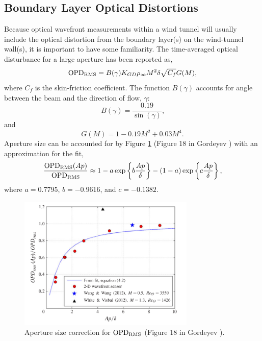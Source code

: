 \subsection{Boundary Layer Optical Distortions}
\label{sect:02_BL_OPD}
Because optical wavefront measurements within a wind tunnel will usually include the optical distortion from the boundary layer(s) on the wind-tunnel wall(s), it is important to have some familiarity.
The time-averaged optical disturbance for a large aperture has been reported as,
\begin{equation}
  \operatorname{OPD_{RMS}} = B(\gamma)K_{GD}\rho_\infty M^2\delta\sqrt{C_f}G(M) \textrm{,}
  \label{eqn:02_opdrms_gor}
\end{equation}
where $C_f$ is the skin-friction coefficient.
The function $B(\gamma)$ accounts for angle between the beam and the direction of flow, $\gamma$:
\begin{equation}
  B(\gamma) = \frac{0.19}{\sin(\gamma)} \textrm{,}
\end{equation}
and
\begin{equation}
  G(M) = 1-0.19M^2+0.03M^4 \textrm{.}
\end{equation}
Aperture size can be accounted for by Figure \ref{fig:02_gordeyev_2014} (Figure 18 in Gordeyev \cite{Gordeyev-2014-jcJndkHM}) with an approximation for the fit,
\begin{equation}
  \frac{\operatorname{OPD_{RMS}}(Ap)}{\operatorname{OPD_{RMS}}} \approx 1-a\exp\left\{b\frac{Ap}{\delta}\right\}-(1-a)\exp\left\{c\frac{Ap}{\delta}\right\} \textrm{,}
  \label{eqn:02_opdrms_gor_fit}
\end{equation}
where $a=0.7795$, $b=-0.9616$, and $c=-0.1382$.
\begin{figure}
  \centering
  \includegraphics[width=0.75\textwidth]{../other-sources/gordeyev_2014_figure_18.png}
  \caption{Aperture size correction for $\operatorname{OPD_{RMS}}$ (Figure 18 in Gordeyev \cite{Gordeyev-2014-jcJndkHM}).}
  \label{fig:02_gordeyev_2014}
\end{figure}

